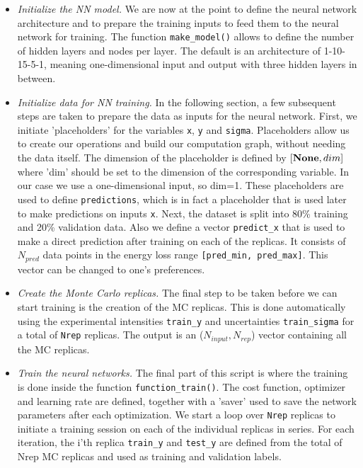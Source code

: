 \begin{itemize}
\item {\it Initialize the NN model.}
%
We are now at the point to define the neural network architecture and to prepare the
training inputs to feed them to the neural network for training. 
%
The function {\tt make\_model()} allows to define the number of hidden layers and 
nodes per layer. The default is an architecture of 1-10-15-5-1, meaning one-dimensional 
input and output with three hidden layers in between.

\item {\it Initialize data for NN training.}
%
In the following section, a few subsequent steps are taken to prepare the data
as inputs for the neural network. 
%
First, we initiate 'placeholders' for the variables
{\tt x}, {\tt y} and {\tt sigma}. Placeholders allow us to create our operations and 
build our computation graph, without needing the data itself. 
%
The dimension of the placeholder is defined by {\tt $[{\bf None}, dim]$} where 'dim'
should be set to the dimension of the corresponding variable. In our case we use a 
one-dimensional input, so dim=1. 
%
These placeholders are used to define {\tt predictions}, which is in fact a placeholder that is used 
later to make predictions on inputs {\tt x}. 
%
Next, the dataset is split into 80\% training and
20\% validation data.
%
Also we define a vector {\tt predict\_x} that is used to make a direct prediction after training
on each of the replicas. It consists of $N_{pred}$ data points in the energy loss range
{\tt [pred\_min, pred\_max]}. This vector can be changed to one's preferences. 

\item {\it Create the Monte Carlo replicas.}
The final step to be taken before we can start training is the creation of the MC replicas.
%
This is done automatically using the experimental intensities {\tt train\_y} and uncertainties
{\tt train\_sigma} for a total of {\tt Nrep} replicas. The output is an ($N_{input}, N_{rep}$) 
vector containing all the MC replicas. 

\item {\it Train the neural networks.}
The final part of this script is where the training is done inside the function {\tt function\_train()}. 
%
The cost function, optimizer and learning rate are defined, together with a 'saver' used to 
save the network parameters after each optimization. 
%
We start a loop over {\tt Nrep} replicas to initiate a training session on each of the individual replicas
in series. 
%
For each iteration, the i'th replica {\tt train\_y} and {\tt test\_y} are defined from the total of Nrep 
MC replicas and used as training and validation labels. 


\end{itemize}
